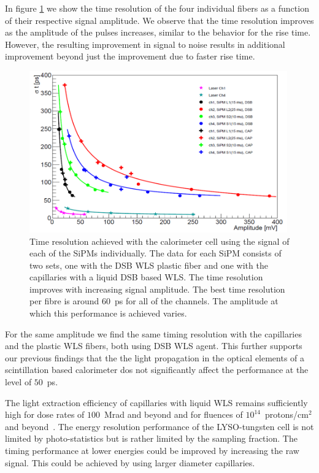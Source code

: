 In figure \ref{TimeResolution} we show the time resolution of the four
individual fibers as a function of their respective signal amplitude. We observe 
that the time resolution improves as the amplitude of the pulses increases, 
similar to the behavior for the rise time. However, the resulting improvement in 
signal to noise results in additional improvement beyond just the improvement due
to faster rise time. 

%
\begin{figure}[htb]
\includegraphics[width=0.99\textwidth]{figures/ShashlikTimeResolution.png}
\caption{\label{TimeResolution} Time resolution achieved with the calorimeter cell using the signal of each 
of the  SiPMs individually. The data for each SiPM consists of two sets, one with the DSB WLS plastic fiber and one with 
the capillaries with a liquid DSB based WLS. The time resolution improves with increasing signal amplitude. The best time 
resolution per fibre is around $60$~ps for all of the channels. The amplitude at which this performance is achieved varies.}
\end{figure}
%


For the same amplitude we find the same timing resolution with the capillaries
and the plastic WLS fibers, both using DSB WLS agent. This further supports our
previous findings that the the light propagation in the optical elements of a
scintillation based calorimeter dos not significantly affect the performance at
the level of $50$~ps.

The light extraction efficiency of capillaries with liquid WLS remains
sufficiently high for dose rates of $100$~Mrad and beyond and for fluences of
$10^{14}$~protons/$\mathrm{cm}^{2}$ and beyond~\cite{shashlik2}. The
energy resolution performance of the LYSO-tungsten cell is not limited by
photo-statistics but is rather limited by the sampling fraction. The timing
performance at lower energies could be improved by increasing the raw signal.
This could be achieved by using larger diameter capillaries.\\ 

